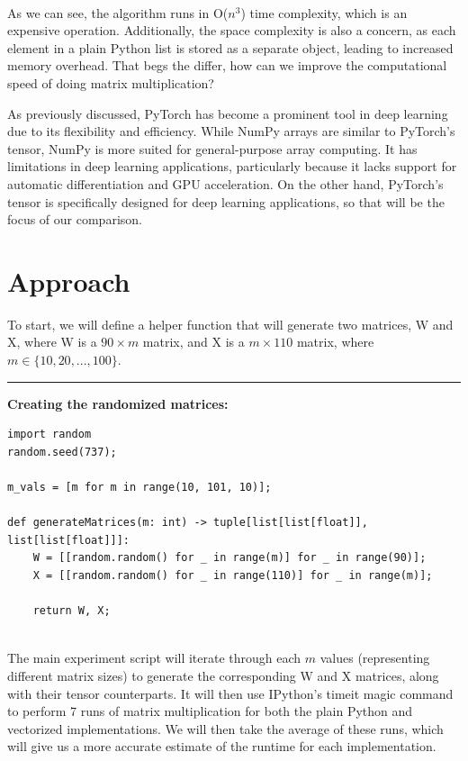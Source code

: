\documentclass[12pt]{article}
\begin{document}
\noindent \\

As we can see, the algorithm runs in O(\( n^3 \)) time complexity, which is an expensive operation.
Additionally, the space complexity is also a concern, as each element in a plain Python list is stored as a separate object,
leading to increased memory overhead.
That begs the differ, how can we improve the computational speed of doing matrix multiplication?

As previously discussed, PyTorch has become a prominent tool in deep learning due to its flexibility and efficiency.
While NumPy arrays are similar to PyTorch's tensor, NumPy is more suited for general-purpose array computing.
It has limitations in deep learning applications, particularly because it lacks support for automatic differentiation and GPU acceleration.
On the other hand, PyTorch's tensor is specifically designed for deep learning applications,
so that will be the focus of our comparison.

\section{Approach}
To start, we will define a helper function that will generate two matrices, W and X, where
W is a \( 90 \times m \) matrix, and X is a \( m \times 110 \) matrix, where
\( m \in \{10, 20, ..., 100\} \).

\newpage

\noindent\rule{\textwidth}{0.4pt}
\noindent\textbf{Creating the randomized matrices:}
\begin{lstlisting}
import random
random.seed(737);

m_vals = [m for m in range(10, 101, 10)];

def generateMatrices(m: int) -> tuple[list[list[float]], list[list[float]]]:
    W = [[random.random() for _ in range(m)] for _ in range(90)];
    X = [[random.random() for _ in range(110)] for _ in range(m)];

    return W, X;
\end{lstlisting}

\noindent \\

\noindent The main experiment script will iterate through each $m$ values (representing different matrix sizes)
to generate the corresponding W and X matrices, along with their tensor counterparts.
It will then use IPython's timeit magic command to perform 7 runs of matrix multiplication
for both the plain Python and vectorized implementations. We will then take the average of these runs,
which will give us a more accurate estimate of the runtime for each implementation.
\end{document}
